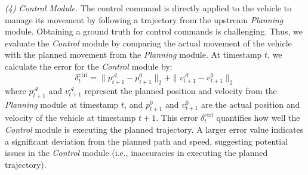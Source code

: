 \noindent \textit{(4) Control Module.} 
The control command is directly applied to the vehicle to manage its movement by following a trajectory from the upstream \textit{Planning} module. Obtaining a ground truth for control commands is challenging. Thus, we evaluate the \textit{Control} module by comparing the actual movement of the vehicle with the planned movement from the \textit{Planning} module.
At timestamp \( t \), we calculate the error for the \textit{Control} module by:
\begin{equation}
    \delta^{\text{ctrl}}_{t} = \| p_{t+1}^{\mathcal{A}} - p_{t+1}^{0} \|_{2} + \| v_{t+1}^{\mathcal{A}} - v_{t+1}^{0} \|_{2}
\end{equation}
where \( p_{t+1}^{\mathcal{A}} \) and \( v_{t+1}^{\mathcal{A}} \) represent the planned position and velocity from the \textit{Planning} module at timestamp \( t \), and \( p_{t+1}^{0} \) and \( v_{t+1}^{0} \) are the actual position and velocity of the vehicle at timestamp \( t+1 \). 
This error \(\delta^{\text{ctrl}}_{t}\) quantifies how well the \textit{Control} module is executing the planned trajectory. A larger error value indicates a significant deviation from the planned path and speed, suggesting potential issues in the \textit{Control} module (i.e., inaccuracies in executing the planned trajectory).


